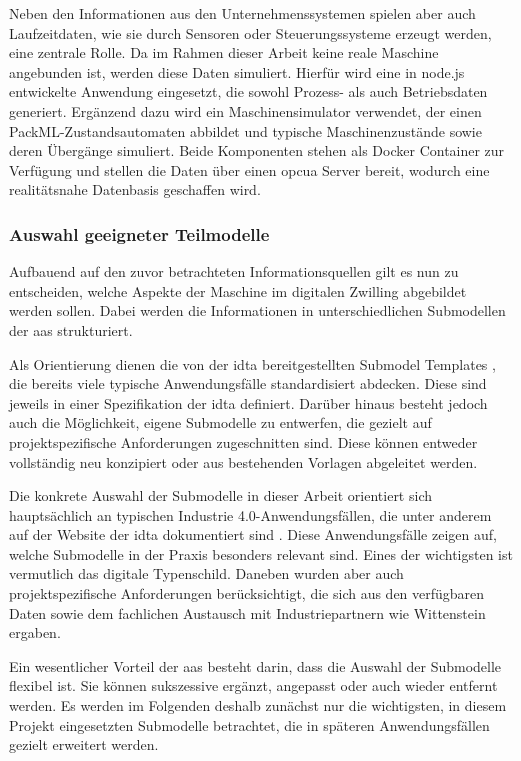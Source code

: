 Neben den Informationen aus den Unternehmenssystemen spielen aber auch Laufzeitdaten, wie sie durch Sensoren oder Steuerungssysteme erzeugt werden, eine zentrale Rolle.
Da im Rahmen dieser Arbeit keine reale Maschine angebunden ist, werden diese Daten simuliert.
Hierfür wird eine in node.js entwickelte Anwendung eingesetzt, die sowohl Prozess- als auch Betriebsdaten generiert. 
Ergänzend dazu wird ein Maschinensimulator verwendet, der einen PackML-Zustandsautomaten abbildet und typische Maschinenzustände sowie deren Übergänge simuliert. 
Beide Komponenten stehen als Docker Container zur Verfügung und stellen die Daten über einen \acs{opcua} Server bereit, wodurch eine realitätsnahe Datenbasis geschaffen wird.
\subsubsection{Auswahl geeigneter Teilmodelle}
Aufbauend auf den zuvor betrachteten Informationsquellen gilt es nun zu entscheiden, welche Aspekte der Maschine im digitalen Zwilling abgebildet werden sollen.
Dabei werden die Informationen in unterschiedlichen Submodellen der \acs{aas} strukturiert.

Als Orientierung dienen die von der \acs{idta} bereitgestellten Submodel Templates \cite{idtaTemplates}, die bereits viele typische Anwendungsfälle standardisiert abdecken.
Diese sind jeweils in einer Spezifikation der \acs{idta} definiert.
Darüber hinaus besteht jedoch auch die Möglichkeit, eigene Submodelle zu entwerfen, die gezielt auf projektspezifische Anforderungen zugeschnitten sind.
Diese können entweder vollständig neu konzipiert oder aus bestehenden Vorlagen abgeleitet werden.

Die konkrete Auswahl der Submodelle in dieser Arbeit orientiert sich hauptsächlich an typischen Industrie 4.0-Anwendungsfällen, die unter anderem auf der Website der \acs{idta} dokumentiert sind \cite{idtaUseCases}.
Diese Anwendungsfälle zeigen auf, welche Submodelle in der Praxis besonders relevant sind.
Eines der wichtigsten ist vermutlich das digitale Typenschild.
Daneben wurden aber auch projektspezifische Anforderungen berücksichtigt, die sich aus den verfügbaren Daten sowie dem fachlichen Austausch mit Industriepartnern wie Wittenstein ergaben.


Ein wesentlicher Vorteil der \acs{aas} besteht darin, dass die Auswahl der Submodelle flexibel ist.
Sie können sukszessive ergänzt, angepasst oder auch wieder entfernt werden.
Es werden im Folgenden deshalb zunächst nur die wichtigsten, in diesem Projekt eingesetzten Submodelle betrachtet, die in späteren Anwendungsfällen gezielt erweitert werden.

